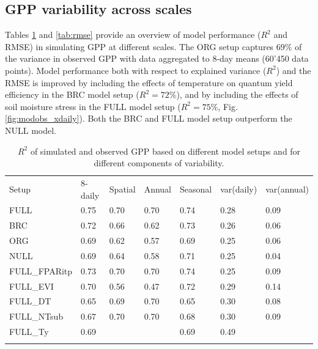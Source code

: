 \documentclass[gmd, manuscript]{copernicus}
\begin{document}
\subsection{GPP variability across scales}
\label{sec:results_gpp}


Tables \ref{tab:rsq} and \ref{tab:rmse} provide an overview of model performance ($R^2$ and RMSE) in simulating GPP at different scales. The ORG setup captures 69\% of the variance in observed GPP with data aggregated to 8-day means (60’450 data points). Model performance both with respect to explained variance ($R^2$) and the RMSE is improved by including the effects of temperature on quantum yield efficiency in the BRC model setup  ($R^2 = 72$\%), and by including the effects of soil moisture stress in the FULL model setup ($R^2 = 75$\%, Fig. \ref{fig:modobs_xdaily}). Both the BRC and FULL model setup outperform the NULL model.

\begin{table}[t]
\caption{$R^2$ of simulated and observed GPP based on different model setups and for different components of variability.} 
\begin{tabular}{lllllll}
  \tophline
  Setup & 8-daily & Spatial & Annual & Seasonal & var(daily) & var(annual) \\ 
  \middlehline
  FULL & 0.75 & 0.70 & 0.70 & 0.74 & 0.28 & 0.09 \\ 
  BRC & 0.72 & 0.66 & 0.62 & 0.73 & 0.26 & 0.06 \\ 
  ORG & 0.69 & 0.62 & 0.57 & 0.69 & 0.25 & 0.06 \\ 
  NULL & 0.69 & 0.64 & 0.58 & 0.71 & 0.25 & 0.04 \\ 
  \middlehline
  FULL\_FPARitp & 0.73 & 0.70 & 0.70 & 0.74 & 0.25 & 0.09 \\ 
  FULL\_EVI & 0.70 & 0.56 & 0.47 & 0.72 & 0.29 & 0.14 \\ 
  \middlehline
  FULL\_DT & 0.65 & 0.69 & 0.70 & 0.65 & 0.30 & 0.08 \\ 
  FULL\_NTsub & 0.67 & 0.70 & 0.70 & 0.68 & 0.30 & 0.09 \\ 
  FULL\_Ty & 0.69 &  &  & 0.69 & 0.49 & \\ 
  \bottomhline
  \end{tabular}
\label{tab:rsq}
\end{table}
\end{document}
